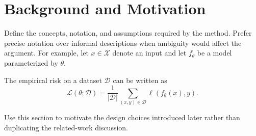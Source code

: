 \section{Background and Motivation}
\label{sec:background}

Define the concepts, notation, and assumptions required by the method. Prefer precise notation over informal descriptions when ambiguity would affect the argument. For example, let $x \in \mathcal{X}$ denote an input and let $f_{\theta}$ be a model parameterized by $\theta$.

The empirical risk on a dataset $\mathcal{D}$ can be written as
\begin{equation}
  \mathcal{L}(\theta; \mathcal{D})
  = \frac{1}{|\mathcal{D}|}
    \sum_{(x,y) \in \mathcal{D}}
    \ell\!\left(f_{\theta}(x), y\right).
  \label{eq:empirical-risk}
\end{equation}

Use this section to motivate the design choices introduced later rather than duplicating the related-work discussion.
